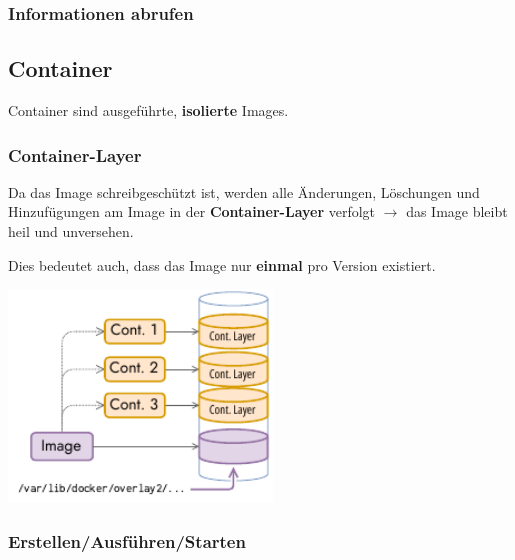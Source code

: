 \documentclass[
  10pt,
  a4paper,
  twocolumn]{article}
\newenvironment{Shaded}{}{}
\newcommand{\ExtensionTok}[1]{\textcolor[rgb]{0.84,0.23,0.29}{\textbf{#1}}}
\newcommand{\NormalTok}[1]{\textcolor[rgb]{0.14,0.16,0.18}{#1}}
\newcommand{\OperatorTok}[1]{\textcolor[rgb]{0.14,0.16,0.18}{#1}}
\begin{document}
\subsubsection{\texorpdfstring{{\small \faTerminal\hspace{1mm}}
Informationen
abrufen}{ Informationen abrufen}}\label{informationen-abrufen}

\begin{Shaded}
\end{Shaded}

\subsection{Container}\label{container}

Container sind ausgeführte, \textbf{isolierte} Images.

\subsubsection{Container-Layer}\label{container-layer}

Da das Image schreibgeschützt ist, werden alle Änderungen, Löschungen
und Hinzufügungen am Image in der \textbf{Container-Layer} verfolgt
\(\rightarrow\) das Image bleibt heil und unversehen.

Dies bedeutet auch, dass das Image nur \textbf{einmal} pro Version
existiert.

\begin{center}
\includegraphics[width=7cm,height=\textheight]{images/docker/volume_clayer.pdf}
\end{center}

\subsubsection{\texorpdfstring{{\small \faTerminal\hspace{1mm}}
Erstellen/Ausführen/Starten}{ Erstellen/Ausführen/Starten}}\label{erstellenausfuxfchrenstarten}
\end{document}
